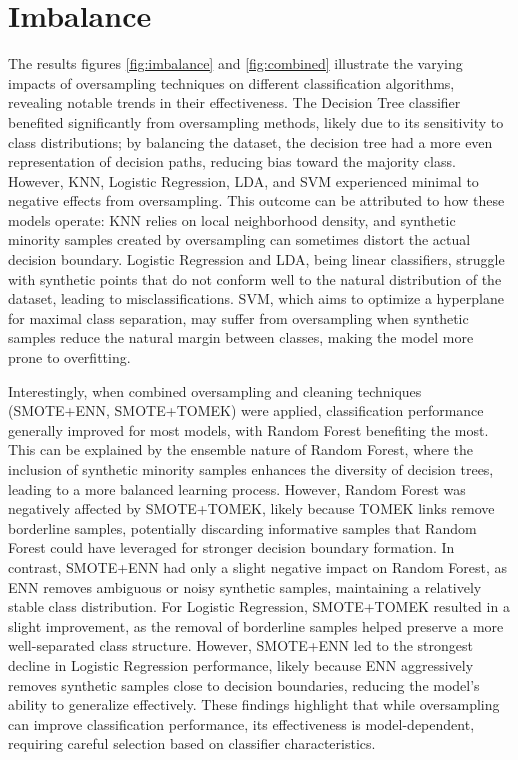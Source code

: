 \documentclass[letterpaper]{report}
\begin{document}
\section{Imbalance}
The results figures \ref{fig:imbalance} and \ref{fig:combined} illustrate the varying impacts of oversampling techniques on different classification algorithms, revealing notable trends in their effectiveness. The Decision Tree classifier benefited significantly from oversampling methods, likely due to its sensitivity to class distributions; by balancing the dataset, the decision tree had a more even representation of decision paths, reducing bias toward the majority class. However, KNN, Logistic Regression, LDA, and SVM experienced minimal to negative effects from oversampling. This outcome can be attributed to how these models operate: KNN relies on local neighborhood density, and synthetic minority samples created by oversampling can sometimes distort the actual decision boundary. Logistic Regression and LDA, being linear classifiers, struggle with synthetic points that do not conform well to the natural distribution of the dataset, leading to misclassifications. SVM, which aims to optimize a hyperplane for maximal class separation, may suffer from oversampling when synthetic samples reduce the natural margin between classes, making the model more prone to overfitting.

Interestingly, when combined oversampling and cleaning techniques (SMOTE+ENN, SMOTE+TOMEK) were applied, classification performance generally improved for most models, with Random Forest benefiting the most. This can be explained by the ensemble nature of Random Forest, where the inclusion of synthetic minority samples enhances the diversity of decision trees, leading to a more balanced learning process. However, Random Forest was negatively affected by SMOTE+TOMEK, likely because TOMEK links remove borderline samples, potentially discarding informative samples that Random Forest could have leveraged for stronger decision boundary formation. In contrast, SMOTE+ENN had only a slight negative impact on Random Forest, as ENN removes ambiguous or noisy synthetic samples, maintaining a relatively stable class distribution. For Logistic Regression, SMOTE+TOMEK resulted in a slight improvement, as the removal of borderline samples helped preserve a more well-separated class structure. However, SMOTE+ENN led to the strongest decline in Logistic Regression performance, likely because ENN aggressively removes synthetic samples close to decision boundaries, reducing the model’s ability to generalize effectively. These findings highlight that while oversampling can improve classification performance, its effectiveness is model-dependent, requiring careful selection based on classifier characteristics.
\end{document}
